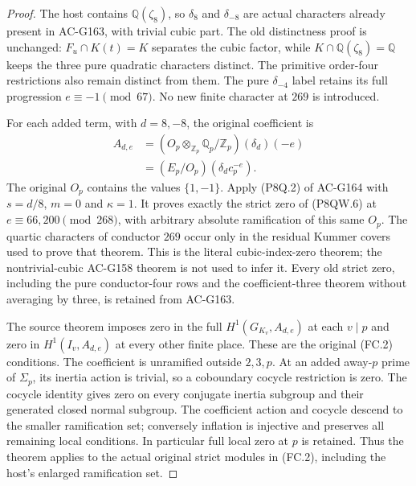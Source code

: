 \begin{proof}
The host contains $\mathbb Q(\zeta_8)$, so $\delta_8$ and
$\delta_{-8}$ are actual characters already present in AC-G163,
with trivial cubic part.
The old distinctness proof is unchanged: $F_u\cap K(t)=K$
separates the cubic factor, while $K\cap\mathbb Q(\zeta_8)=\mathbb Q$
keeps the three pure quadratic characters distinct.
The primitive order-four restrictions also remain distinct from them.
The pure $\delta_{-4}$ label retains its full progression
$e\equiv-1\pmod{67}$.
No new finite character at $269$ is introduced.

For each added term, with $d=8,-8$, the original coefficient is
\[
 \begin{aligned}
 A_{d,e}&=(O_p\otimes_{\mathbb Z_p}\mathbb Q_p/\mathbb Z_p)
                                                   (\delta_d)(-e)\\
    &=(E_p/O_p)(\delta_dc_p^{-e}).
 \end{aligned}
 \tag{P8QW.6}
\]
The original $O_p$ contains the values $\{1,-1\}$.
Apply (P8Q.2) of AC-G164 with $s=d/8$, $m=0$ and $\kappa=1$.
It proves exactly the strict zero of (P8QW.6) at
$e\equiv66,200\pmod{268}$, with arbitrary absolute
ramification of this same $O_p$.
The quartic characters of conductor $269$ occur only in the
residual Kummer covers used to prove that theorem.
This is the literal cubic-index-zero theorem; the nontrivial-cubic
AC-G158 theorem is not used to infer it.
Every old strict zero, including the pure conductor-four rows
and the coefficient-three theorem without averaging by three,
is retained from AC-G163.

The source theorem imposes zero in the full
$H^1(G_{K_v},A_{d,e})$ at each $v\mid p$ and zero in
$H^1(I_v,A_{d,e})$ at every other finite place.
These are the original (FC.2) conditions.
The coefficient is unramified outside $2,3,p$.
At an added away-$p$ prime of $\Sigma_p$, its inertia action is
trivial, so a coboundary cocycle restriction is zero.
The cocycle identity gives zero on every conjugate inertia
subgroup and their generated closed normal subgroup.
The coefficient action and cocycle descend to the smaller
ramification set; conversely inflation is injective and preserves
all remaining local conditions.  In particular full local zero
at $p$ is retained.
Thus the theorem applies to the actual original strict modules
in (FC.2), including the host's enlarged ramification set.


\end{proof}

